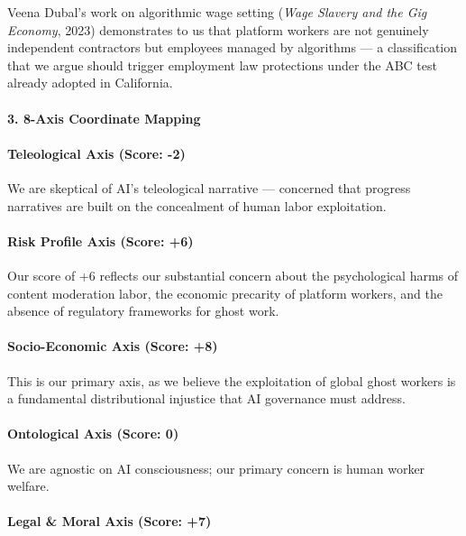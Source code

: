 Veena Dubal's work on algorithmic wage setting (\emph{Wage Slavery and
the Gig Economy}, 2023) demonstrates to us that platform workers are not
genuinely independent contractors but employees managed by algorithms
--- a classification that we argue should trigger employment law
protections under the ABC test already adopted in California.

\paragraph{3. 8-Axis Coordinate
Mapping}\label{axis-coordinate-mapping-41}

\paragraph{Teleological Axis (Score:
-2)}\label{teleological-axis-score--2-4}

We are skeptical of AI's teleological narrative --- concerned that
progress narratives are built on the concealment of human labor
exploitation.

\paragraph{Risk Profile Axis (Score:
+6)}\label{risk-profile-axis-score-6-4}

Our score of +6 reflects our substantial concern about the psychological
harms of content moderation labor, the economic precarity of platform
workers, and the absence of regulatory frameworks for ghost work.

\paragraph{Socio-Economic Axis (Score:
+8)}\label{socio-economic-axis-score-8-3}

This is our primary axis, as we believe the exploitation of global ghost
workers is a fundamental distributional injustice that AI governance
must address.

\paragraph{Ontological Axis (Score:
0)}\label{ontological-axis-score-0-16}

We are agnostic on AI consciousness; our primary concern is human worker
welfare.

\paragraph{Legal \& Moral Axis (Score:
+7)}\label{legal-moral-axis-score-7-4}

